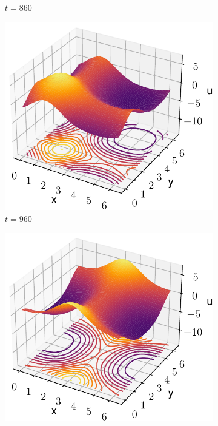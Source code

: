 \documentclass[twoside]{article}
\begin{document}
\begin{figure}[ht]
\begin{subfigure}[ht]{0.248\textwidth}
    \caption{$t= 860$}
  \end{subfigure}\hfill
  \begin{subfigure}[ht]{0.248\textwidth}
    \includegraphics[width=\textwidth]{images/slice_nu1_0.4_nu2_0.4_time_960.0.pdf}
    \caption{$t= 960$}
  \end{subfigure}\hfill
  \begin{subfigure}[ht]{0.248\textwidth}
    \includegraphics[width=\textwidth]{images/slice_nu1_0.4_nu2_0.4_time_1080.0.pdf}

\end{subfigure}
\end{figure}
\end{document}
